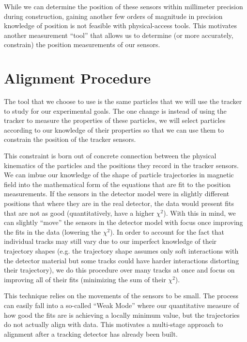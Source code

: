 While we can determine the position of these sensors within millimeter precision
during construction, gaining another few orders of magnitude in precision knowledge
of position is not feasible with physical-access tools.
This motivates another measurement ``tool'' that allows us to determine
(or more accurately, constrain) the position measurements of our sensors.

\section{Alignment Procedure}
The tool that we choose to use is the same particles that we will use the tracker
to study for our experimental goals.
The one change is instead of using the tracker to measure the properties of these particles,
we will select particles according to our knowledge of their properties so that we can use
them to constrain the position of the tracker sensors.

This constraint is born out of concrete connection between the physical
kinematics of the particles and the positions they record in the tracker sensors.
We can imbue our knowledge of the shape of particle trajectories in magnetic field
into the mathematical form of the equations that are fit to the position measurements.
If the sensors in the detector model were in slightly different positions
that where they are in the real detector, the data would present fits that are
not as good (quantitatively, have a higher $\chi^2$). With this in mind, we
can slightly ``move'' the sensors in the detector model with focus once
improving the fits in the data (lowering the $\chi^2$). In order to account
for the fact that individual tracks may still vary due to our imperfect knowledge
of their trajectory shapes (e.g. the trajectory shape assumes only soft interactions
with the detector material but some tracks could have harder interactions distorting
their trajectory), we do this procedure over many tracks at once and focus on improving
all of their fits (minimizing the sum of their $\chi^2$).

This technique relies on the movements of the sensors to be small.
The process can easily fall into a so-called ``Weak Mode'' where our quantitative
measure of how good the fits are is achieving a locally minimum value, but
the trajectories do not actually align with data. This motivates a multi-stage
approach to alignment after a tracking detector has already been built.

